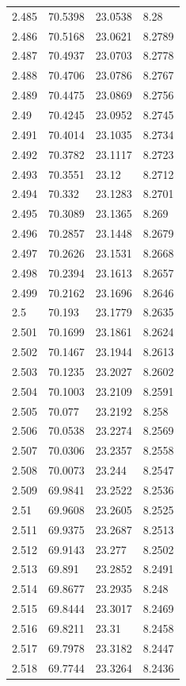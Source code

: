 \begin{tabular}{llll}
2.485 & 70.5398 & 23.0538 & 8.28 \\
2.486 & 70.5168 & 23.0621 & 8.2789 \\
2.487 & 70.4937 & 23.0703 & 8.2778 \\
2.488 & 70.4706 & 23.0786 & 8.2767 \\
2.489 & 70.4475 & 23.0869 & 8.2756 \\
2.49 & 70.4245 & 23.0952 & 8.2745 \\
2.491 & 70.4014 & 23.1035 & 8.2734 \\
2.492 & 70.3782 & 23.1117 & 8.2723 \\
2.493 & 70.3551 & 23.12 & 8.2712 \\
2.494 & 70.332 & 23.1283 & 8.2701 \\
2.495 & 70.3089 & 23.1365 & 8.269 \\
2.496 & 70.2857 & 23.1448 & 8.2679 \\
2.497 & 70.2626 & 23.1531 & 8.2668 \\
2.498 & 70.2394 & 23.1613 & 8.2657 \\
2.499 & 70.2162 & 23.1696 & 8.2646 \\
2.5 & 70.193 & 23.1779 & 8.2635 \\
2.501 & 70.1699 & 23.1861 & 8.2624 \\
2.502 & 70.1467 & 23.1944 & 8.2613 \\
2.503 & 70.1235 & 23.2027 & 8.2602 \\
2.504 & 70.1003 & 23.2109 & 8.2591 \\
2.505 & 70.077 & 23.2192 & 8.258 \\
2.506 & 70.0538 & 23.2274 & 8.2569 \\
2.507 & 70.0306 & 23.2357 & 8.2558 \\
2.508 & 70.0073 & 23.244 & 8.2547 \\
2.509 & 69.9841 & 23.2522 & 8.2536 \\
2.51 & 69.9608 & 23.2605 & 8.2525 \\
2.511 & 69.9375 & 23.2687 & 8.2513 \\
2.512 & 69.9143 & 23.277 & 8.2502 \\
2.513 & 69.891 & 23.2852 & 8.2491 \\
2.514 & 69.8677 & 23.2935 & 8.248 \\
2.515 & 69.8444 & 23.3017 & 8.2469 \\
2.516 & 69.8211 & 23.31 & 8.2458 \\
2.517 & 69.7978 & 23.3182 & 8.2447 \\
2.518 & 69.7744 & 23.3264 & 8.2436 \\

\end{tabular}
